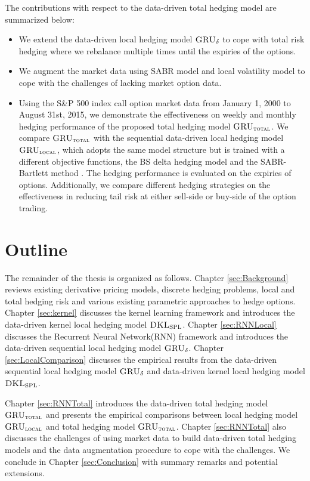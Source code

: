 \documentclass[letterpaper,12pt,titlepage,oneside,final]{book}
\numberwithin{equation}{section}
\theoremstyle{definition}
\newcommand{\model}{\textsc{GRU}_\delta}
\newcommand{\modelT}{\textsc{GRU}_{\textsc{total}}}
\newcommand{\modelL}{\textsc{GRU}_{\textsc{local}}}
\newcommand{\DKLs}{\bf\textsc{DKL}_{\text{SPL}}}
\begin{document}
The contributions with respect to the data-driven total hedging model \cite{knian2020} are summarized below:
\begin{itemize}
	\item  We extend the data-driven local hedging model $\model$ \cite{knian2019} to cope with total risk hedging  where we rebalance multiple times until the expiries of the options.
	\item  We augment the market data using SABR model and local volatility model to cope with the challenges of lacking market option data.
	\item  Using the S\&P 500 index call option market data from January 1, 2000 to  August 31st, 2015, we demonstrate the effectiveness on  weekly and monthly hedging performance of the proposed total hedging model $\modelT$. We compare $\modelT$ with the sequential data-driven local hedging model $\modelL$, which adopts the same model structure but is trained with a different  objective functions, the BS delta hedging model and the SABR-Bartlett method \cite{bartlett2006hedging}. The hedging performance is evaluated on the expiries of  options. Additionally, we compare different hedging strategies on the effectiveness in reducing  tail risk at either sell-side or buy-side of the option trading.

\end{itemize}
\section{Outline}
The remainder of the thesis is organized as follows.
Chapter \ref{sec:Background}  reviews existing derivative pricing models, discrete hedging problems, local and total hedging risk and various existing parametric approaches to hedge options.
Chapter \ref{sec:kernel}  discusses the kernel learning framework and introduces the data-driven kernel local hedging model $\DKLs$. 
Chapter \ref{sec:RNNLocal} discusses the Recurrent Neural Network(RNN) framework and introduces the data-driven sequential local hedging model $\model$.
Chapter \ref{sec:LocalComparison} discusses the  empirical results  from  the data-driven sequential local hedging model $\model$ and data-driven kernel local hedging model $\DKLs$.

Chapter \ref{sec:RNNTotal} introduces the data-driven  total hedging model $\modelT$ and presents the empirical comparisons between local hedging model $\modelL$ and total hedging model $\modelT$.
Chapter \ref{sec:RNNTotal}  also discusses the challenges of using market data to build data-driven total hedging models and the data augmentation procedure to cope with the challenges.
We conclude in Chapter \ref{sec:Conclusion}  with summary remarks and potential extensions.
\end{document}
